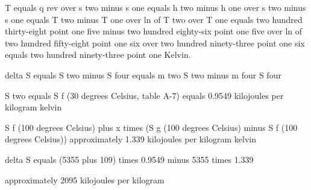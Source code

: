 T equals q rev over s two minus s one equals h two minus h one over s two minus s one equals T two minus T one over ln of T two over T one equals two hundred thirty-eight point one five minus two hundred eighty-six point one five over ln of two hundred fifty-eight point one six over two hundred ninety-three point one six equals two hundred ninety-three point one Kelvin.

delta S equals S two minus S four equals m two S two minus m four S four  

S two equals S f (30 degrees Celsius, table A-7) equals 0.9549 kilojoules per kilogram kelvin  

S f (100 degrees Celsius) plus x times (S g (100 degrees Celsius) minus S f (100 degrees Celsius)) approximately 1.339 kilojoules per kilogram kelvin  

delta S equals (5355 plus 109) times 0.9549 minus 5355 times 1.339  

approximately 2095 kilojoules per kilogram